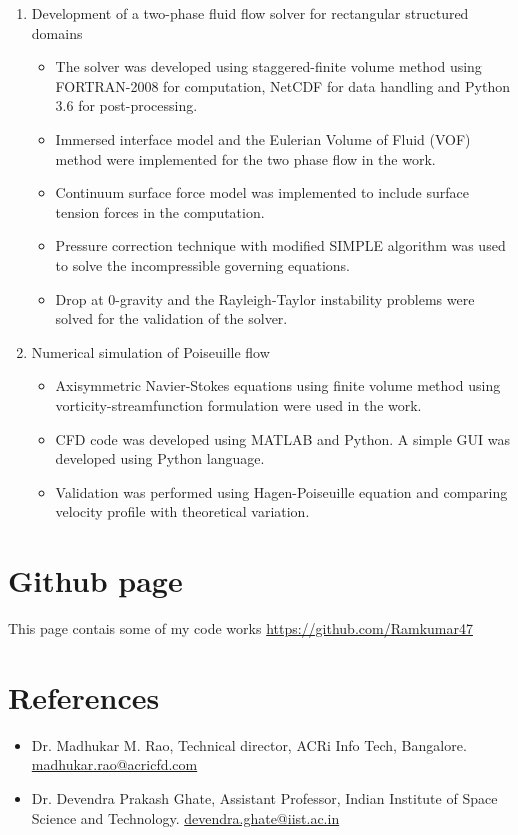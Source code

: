 \begin{enumerate}
	\item Development of a two-phase fluid flow solver for rectangular structured domains
		\begin{itemize}
			\item The solver was developed using staggered-finite volume method using FORTRAN-2008 for
				computation, NetCDF for data handling and Python 3.6 for post-processing.
			\item Immersed interface model and the Eulerian Volume of Fluid (VOF) method were
				implemented for the two phase flow in the work.
			\item Continuum surface force model was implemented to include surface tension forces in the computation.
			\item Pressure correction technique with modified SIMPLE algorithm was used to
				solve the incompressible governing equations.
			\item Drop at 0-gravity and the Rayleigh-Taylor instability problems were solved for the validation of the solver.
		\end{itemize}

	\item Numerical simulation of Poiseuille flow
		\begin{itemize}
			\item Axisymmetric Navier-Stokes equations using finite volume method using vorticity-streamfunction formulation were used in the work.
			\item CFD code was developed using MATLAB and Python. A simple GUI was developed using Python language.
			\item Validation was performed using Hagen-Poiseuille equation and comparing velocity profile with
				theoretical variation.
		\end{itemize}
\end{enumerate}

\section{Github page}
This page contais some of my code works
\url{https://github.com/Ramkumar47}

\section{References}
\begin{itemize}
	\item Dr. Madhukar M. Rao, Technical director, ACRi Info Tech, Bangalore. \href{mailto: madhukar.rao@acricfd.com}{madhukar.rao@acricfd.com}
	\item Dr. Devendra Prakash Ghate, Assistant Professor, Indian Institute of Space Science and Technology. \href{mailto: devendra.ghate@iist.ac.in}{devendra.ghate@iist.ac.in}
\end{itemize}

